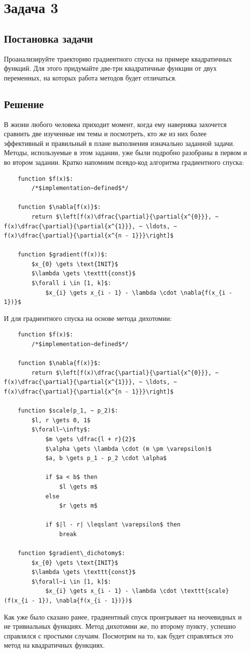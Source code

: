 \documentclass[12pt, a4paper, oneside, final]{article}
\begin{document}
	\section*{Задача 3}
	\subsection*{Постановка задачи}
	Проанализируйте траекторию градиентного спуска на примере квадратичных функций. Для этого придумайте две-три квадратичные функции от двух переменных, на которых работа методов будет отличаться.
	\subsection*{Решение}
	В жизни любого человека приходит момент, когда ему наверняка захочется сравнить две изученные им темы и посмотреть, кто же из них более эффективный и правильный в плане выполнения изначально заданной задачи. Методы, используемые в этом задании, уже были подробно разобраны в первом и во втором задании. Кратко напомним псевдо-код алгоритма градиентного спуска:
	\begin{lstlisting}
	function $f(x)$:
		/*$implementation~defined$*/

	function $\nabla{f(x)}$:
		return $\left[f(x)\dfrac{\partial}{\partial{x^{0}}}, ~ f(x)\dfrac{\partial}{\partial{x^{1}}}, ~ \ldots, ~ f(x)\dfrac{\partial}{\partial{x^{n - 1}}}\right]$

	function $gradient(f(x))$:
		$x_{0} \gets \text{INIT}$
		$\lambda \gets \texttt{const}$
		$\forall i \in [1, k]$:
		    $x_{i} \gets x_{i - 1} - \lambda \cdot \nabla{f(x_{i - 1})}$
	\end{lstlisting}
	И для градиентного спуска на основе метода дихотомии:
	\begin{lstlisting}
	function $f(x)$:
		/*$implementation~defined$*/

	function $\nabla{f(x)}$:
		return $\left[f(x)\dfrac{\partial}{\partial{x^{0}}}, ~ f(x)\dfrac{\partial}{\partial{x^{1}}}, ~ \ldots, ~ f(x)\dfrac{\partial}{\partial{x^{n - 1}}}\right]$

	function $scale(p_1, ~ p_2)$:
		$l, r \gets 0, 1$
		$\forall~\infty$:
			$m \gets \dfrac{l + r}{2}$
			$\alpha \gets \lambda \cdot (m \pm \varepsilon)$
			$a, b \gets p_1 - p_2 \cdot \alpha$

			if $a < b$ then
				$l \gets m$
			else
				$r \gets m$

			if $|l - r| \leqslant \varepsilon$ then
				break

	function $gradient\_dichotomy$:
		$x_{0} \gets \text{INIT}$
		$\lambda \gets \texttt{const}$
		$\forall~i \in [1, k]$:
			$x_{i} \gets x_{i - 1} - \lambda \cdot \texttt{scale}(f(x_{i - 1}), \nabla{f(x_{i - 1})})$
	\end{lstlisting}
	Как уже было сказано ранее, градиентный спуск проигрывает на неочевидных и не тривиальных функциях. Метод дихотомии же, по второму пункту, успешно справлялся с простыми случаям. Посмотрим на то, как будет справляться это метод на квадратичных функциях.
\end{document}
